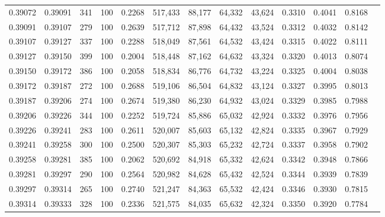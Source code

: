 \begin{tabular}{rrrrrrrrrrrrr}
0.39072 & 0.39091 &   341 & 100 &                                     0.2268 & 517,433 &  88,177 &  64,332 &  43,624 & 0.3310 & 0.4041 & 0.8168 \\
0.39091 & 0.39107 &   279 & 100 &                                     0.2639 & 517,712 &  87,898 &  64,432 &  43,524 & 0.3312 & 0.4032 & 0.8142 \\
0.39107 & 0.39127 &   337 & 100 &                                     0.2288 & 518,049 &  87,561 &  64,532 &  43,424 & 0.3315 & 0.4022 & 0.8111 \\
0.39127 & 0.39150 &   399 & 100 &                                     0.2004 & 518,448 &  87,162 &  64,632 &  43,324 & 0.3320 & 0.4013 & 0.8074 \\
0.39150 & 0.39172 &   386 & 100 &                                     0.2058 & 518,834 &  86,776 &  64,732 &  43,224 & 0.3325 & 0.4004 & 0.8038 \\
0.39172 & 0.39187 &   272 & 100 &                                     0.2688 & 519,106 &  86,504 &  64,832 &  43,124 & 0.3327 & 0.3995 & 0.8013 \\
0.39187 & 0.39206 &   274 & 100 &                                     0.2674 & 519,380 &  86,230 &  64,932 &  43,024 & 0.3329 & 0.3985 & 0.7988 \\
0.39206 & 0.39226 &   344 & 100 &                                     0.2252 & 519,724 &  85,886 &  65,032 &  42,924 & 0.3332 & 0.3976 & 0.7956 \\
0.39226 & 0.39241 &   283 & 100 &                                     0.2611 & 520,007 &  85,603 &  65,132 &  42,824 & 0.3335 & 0.3967 & 0.7929 \\
0.39241 & 0.39258 &   300 & 100 &                                     0.2500 & 520,307 &  85,303 &  65,232 &  42,724 & 0.3337 & 0.3958 & 0.7902 \\
0.39258 & 0.39281 &   385 & 100 &                                     0.2062 & 520,692 &  84,918 &  65,332 &  42,624 & 0.3342 & 0.3948 & 0.7866 \\
0.39281 & 0.39297 &   290 & 100 &                                     0.2564 & 520,982 &  84,628 &  65,432 &  42,524 & 0.3344 & 0.3939 & 0.7839 \\
0.39297 & 0.39314 &   265 & 100 &                                     0.2740 & 521,247 &  84,363 &  65,532 &  42,424 & 0.3346 & 0.3930 & 0.7815 \\
0.39314 & 0.39333 &   328 & 100 &                                     0.2336 & 521,575 &  84,035 &  65,632 &  42,324 & 0.3350 & 0.3920 & 0.7784 \\

\end{tabular}
